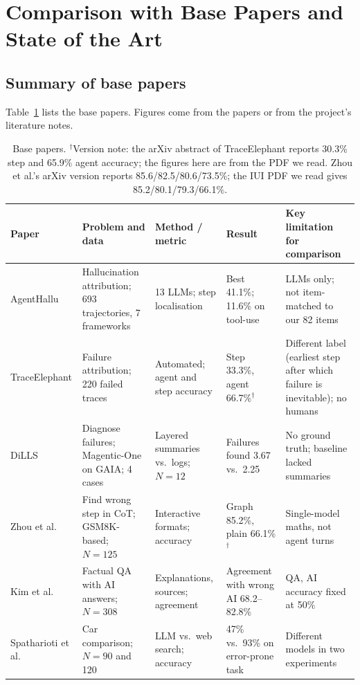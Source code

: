 \documentclass[conference]{IEEEtran}
\begin{document}
\section{Comparison with Base Papers and State of the Art}
\subsection{Summary of base papers}
Table~\ref{tab:cmp} lists the base papers. Figures come from the papers or from the project's literature notes.

\begin{table}[t]
\centering\footnotesize
\caption{Base papers. $^\dagger$Version note: the arXiv abstract of TraceElephant reports 30.3\% step and 65.9\% agent accuracy; the figures here are from the PDF we read. Zhou et al.'s arXiv version reports 85.6/82.5/80.6/73.5\%; the IUI PDF we read gives 85.2/80.1/79.3/66.1\%.}
\label{tab:cmp}
\begin{tabular}{@{}p{2.2cm}p{3.1cm}p{2.7cm}p{2.7cm}p{5.3cm}@{}}
\toprule
Paper & Problem and data & Method / metric & Result & Key limitation for comparison\\
\midrule
AgentHallu \cite{liu2026agenthallu} & Hallucination attribution; 693 trajectories, 7 frameworks & 13 LLMs; step localisation & Best 41.1\%; 11.6\% on tool-use & LLMs only; not item-matched to our 82 items\\
TraceElephant \cite{chen2026elephant} & Failure attribution; 220 failed traces & Automated; agent and step accuracy & Step 33.3\%, agent 66.7\%$^\dagger$ & Different label (earliest step after which failure is inevitable); no humans\\
DiLLS \cite{sheng2026dills} & Diagnose failures; Magentic-One on GAIA; 4 cases & Layered summaries vs.\ logs; $N=12$ & Failures found 3.67 vs.\ 2.25 & No ground truth; baseline lacked summaries\\
Zhou et al.\ \cite{zhou2026verification} & Find wrong step in CoT; GSM8K-based; $N=125$ & Interactive formats; accuracy & Graph 85.2\%, plain 66.1\%$^\dagger$ & Single-model maths, not agent turns\\
Kim et al.\ \cite{kim2025reliance} & Factual QA with AI answers; $N=308$ & Explanations, sources; agreement & Agreement with wrong AI 68.2--82.8\% & QA, AI accuracy fixed at 50\%\\
Spatharioti et al.\ \cite{spatharioti2025search} & Car comparison; $N=90$ and 120 & LLM vs.\ web search; accuracy & 47\% vs.\ 93\% on error-prone task & Different models in two experiments\\
\bottomrule
\end{tabular}
\end{table}
\end{document}
